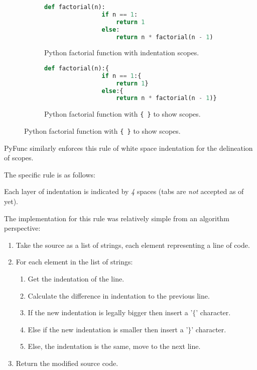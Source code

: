 \documentclass{l4proj}
\begin{document}
\begin{figure}[h]
    \centering
    \begin{subfigure}[b]{0.45\textwidth}
        \begin{lstlisting}[language=Python]
            def factorial(n):
                if n == 1:
                    return 1
                else:
                    return n * factorial(n - 1)
        \end{lstlisting}
        \caption{Python factorial function with indentation scopes.}
    \end{subfigure}
    \hfill
    \begin{subfigure}[b]{0.45\textwidth}
        
        \begin{lstlisting}[language=Python]
            def factorial(n):{
                if n == 1:{
                    return 1}
                else:{
                    return n * factorial(n - 1)}}
        \end{lstlisting}
        \caption{Python factorial function with \texttt{\{ \}} to show scopes.}
    \end{subfigure} 
\end{figure}

PyFunc similarly enforces this rule of white space indentation for the delineation of scopes.

The specific rule is as follows:

\begin{center}
Each layer of indentation is indicated by \emph{4} spaces (tabs are \emph{not} accepted as of yet).
\end{center}

The implementation for this rule was relatively simple from an algorithm perspective:

\begin{enumerate}
    \item Take the source as a list of strings, each element representing a line of code.
    \item For each element in the list of strings:
    \begin{enumerate}
        \item Get the indentation of the line.
        \item Calculate the difference in indentation to the previous line.
        \item If the new indentation is legally bigger then insert a '$\{$' character.
        \item Else if the new indentation is smaller then insert a '$\}$' character.
        \item Else, the indentation is the same, move to the next line.
    \end{enumerate}
    \item Return the modified source code.
\end{enumerate}
\end{document}
